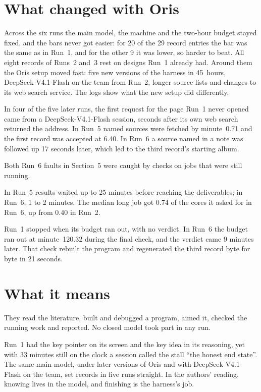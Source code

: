 \documentclass[11pt,letterpaper]{article}
\begin{document}
\section{What changed with Oris}

Across the six runs the main model, the machine and the two-hour budget stayed fixed, and the bars never got easier: for 20 of the 29 record entries the bar was the same as in Run~1, and for the other 9 it was lower, so harder to beat. All eight records of Runs~2 and~3 rest on designs Run~1 already had. Around them the Oris setup moved fast: five new versions of the harness in 45~hours, \mbox{DeepSeek-V4.1-Flash} on the team from Run~2, longer source lists and changes to its web search service. The logs show what the new setup did differently.

 In four of the five later runs, the first request for the page Run~1 never opened came from a \mbox{DeepSeek-V4.1-Flash} session, seconds after its own web search returned the address. In Run~5 named sources were fetched by minute~0.71 and the first record was accepted at 6.40. In Run~6 a source named in a note was followed up 17 seconds later, which led to the third record's starting album.

 Both Run~6 faults in Section~5 were caught by checks on jobs that were still running.

 In Run~5 results waited up to 25 minutes before reaching the deliverables; in Run~6, 1 to 2 minutes. The median long job got 0.74 of the cores it asked for in Run~6, up from 0.40 in Run~2.

 Run~1 stopped when its budget ran out, with no verdict. In Run~6 the budget ran out at minute~120.32 during the final check, and the verdict came 9 minutes later. That check rebuilt the program and regenerated the third record byte for byte in 21 seconds.

\section{What it means}

 They read the literature, built and debugged a program, aimed it, checked the running work and reported. No closed model took part in any run.

 Run~1 had the key pointer on its screen and the key idea in its reasoning, yet with 33 minutes still on the clock a session called the stall ``the honest end state''. The same main model, under later versions of Oris and with \mbox{DeepSeek-V4.1-Flash} on the team, set records in five runs straight. In the authors' reading, knowing lives in the model, and finishing is the harness's job.
\end{document}
